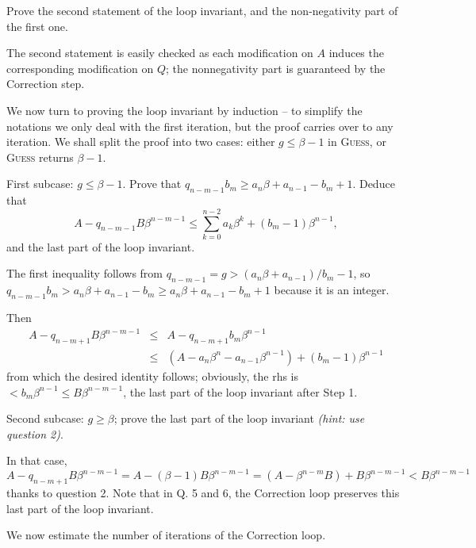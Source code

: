 \documentclass[11pt]{exam}
\theoremstyle{definition}
\begin{document}
{\begin{questions}
\question Prove the second statement of the loop invariant, and the
non-negativity part of the first one.

\begin{solution}
The second statement is easily checked as each modification
on $A$ induces the corresponding modification on $Q$; the nonnegativity
part is guaranteed by the Correction step. 
\end{solution}
\bigskip

We now turn to proving the loop invariant by induction -- to simplify
the notations we only deal with the first iteration, but the proof
carries over to any iteration. We shall split the proof into two
cases: either $g\leq \beta - 1$ in \textsc{Guess}, or \textsc{Guess} returns $\beta -
1$.
\bigskip

\question First subcase: $g\leq \beta - 1$. Prove that
$q_{n-m-1} b_m \geq a_n \beta + a_{n-1} - b_m + 1$. Deduce that
$$A - q_{n-m-1} B \beta^{n-m-1} \leq \sum_{k=0}^{n-2} a_k \beta^k + (b_m - 1) \beta^{n-1},$$
and the last part of the loop invariant.
\bigskip

\begin{solution}
The first inequality follows from
$q_{n-m-1} = g > (a_n \beta + a_{n-1}) / b_m - 1$, so $q_{n-m-1} b_m > a_n \beta + a_{n-1} - b_m \geq a_n \beta + a_{n-1} - b_m + 1$ because it is an integer.

Then
\begin{eqnarray*}
  A - q_{n-m+1} B \beta^{n-m-1} & \leq & A - q_{n-m+1} b_m \beta^{n-1}\\
  & \leq &
  (A - a_n \beta^n - a_{n-1} \beta^{n-1}) + (b_m - 1) \beta^{n-1}
\end{eqnarray*}
from which the desired identity follows; obviously, the rhs is $< b_m
\beta^{n-1} \leq B \beta^{n-m-1}$, the last part of the loop invariant after
Step 1. 
\end{solution}

\question Second subcase: $g \geq \beta$; prove the last part of the
loop invariant \textit{(hint: use question 2)}. 

\begin{solution}
In that case, $A - q_{n-m+1} B \beta^{n-m-1} = A - (\beta - 1)
B \beta^{n-m-1} = (A - \beta^{n-m} B) + B \beta^{n-m-1} < B \beta^{n-m-1}$
thanks to question 2.
Note that in Q. 5 and 6, the Correction loop preserves this last part of the loop invariant.
\end{solution}
\bigskip

We now estimate the number of iterations of the Correction loop.
\bigskip


\end{questions}}
\end{document}
